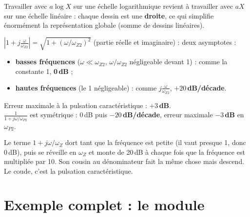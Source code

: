 \begin{rembox}[title=Remarque importante]
Travailler avec $a\log X$ sur une échelle logarithmique revient à travailler avec $aX$ sur
une échelle linéaire : chaque dessin est une \textbf{droite}, ce qui simplifie énormément la
représentation globale (somme de dessins linéaires).
\end{rembox}


\begin{propbox}[title={Termes 4 et 5 : $1 + j\frac\omega{\omega_{Z2}}$ et $\frac1{1 + j\omega/\omega_{P2}}$}]
$\left|1 + j\frac\omega{\omega_{Z2}}\right| = \sqrt{1 + (\omega/\omega_{Z2})^2}$ (partie réelle
et imaginaire) : deux asymptotes :
\begin{itemize}
  \item \textbf{basses fréquences} ($\omega\ll\omega_{Z2}$, $\omega/\omega_{Z2}$ négligeable
        devant 1) : comme la constante 1, \textbf{0\,dB} ;
  \item \textbf{hautes fréquences} (le 1 négligeable) : comme $j\frac\omega{\omega_{Z2}}$,
        \textbf{$+20$\,dB/décade}.
\end{itemize}
Erreur maximale à la pulsation caractéristique : \textbf{$+3$\,dB}. \\
$\frac1{1 + j\omega/\omega_{P2}}$ est symétrique : 0\,dB puis \textbf{$-20$\,dB/décade},
erreur maximale \textbf{$-3$\,dB} en $\omega_{P2}$.
\end{propbox}

\begin{goatbox}
Le terme \og $1 + j\omega/\omega_Z$\fg{} dort tant que la fréquence est petite (il vaut
presque 1, donc 0\,dB), puis se réveille en $\omega_Z$ et monte de 20\,dB à chaque fois que
la fréquence est multipliée par 10. Son cousin au dénominateur fait la même chose mais
descend. Le coude, c'est la pulsation caractéristique.
\end{goatbox}

\section{Exemple complet : le module}


